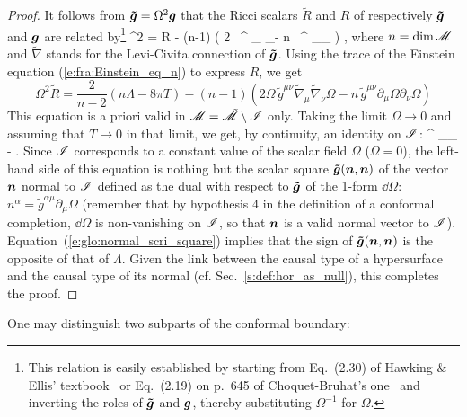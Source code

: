\begin{proof}
It follows from $\bm{\tilde{g}} = \Omega^2 \bm{g}$ that the Ricci scalars $\tilde{R}$
and $R$ of respectively $\bm{\tilde{g}}$ and $\bm{g}$ are related by\footnote{This relation is
easily established by starting from Eq.~(2.30) of Hawking \& Ellis' textbook~\cite{HawkiE73} or Eq.~(2.19) on p.~645 of Choquet-Bruhat's one~\cite{Choqu09} and inverting the roles of $\bm{\tilde{g}}$ and $\bm{g}$, thereby substituting
$\Omega^{-1}$ for $\Omega$.}
\be \label{e:glo:tildeR_R}
    \Omega^2  = R - (n-1) \left( 2 \Omega \, ^{\mu\nu} \tilde{\nabla}_\mu
    \tilde{\nabla}_\nu \Omega - n \, ^{\mu\nu} \partial_\mu \Omega \partial_\nu \Omega
    \right) ,
\ee
where $n = \mathrm{dim}\, \mathscr{M}$ and $\tilde{\nabla}$ stands for the Levi-Civita connection of
$\bm{\tilde{g}}$. Using the trace of the Einstein equation (\ref{e:fra:Einstein_eq_n}) to
express $R$, we get
\[
    \Omega^2 \tilde{R} = \frac{2}{n-2}\left( n \Lambda - 8\pi T \right)
     - (n-1) \left( 2 \Omega \, \tilde{g}^{\mu\nu} \tilde{\nabla}_\mu
    \tilde{\nabla}_\nu \Omega - n \, \tilde{g}^{\mu\nu} \partial_\mu \Omega \partial_\nu \Omega
    \right)
\]
This equation is a priori valid in $\mathscr{M} = \tilde{\mathscr{M}}\setminus\mathscr{I}$ only.
Taking the limit $\Omega\rightarrow 0$ and
assuming that $T\rightarrow 0$ in that limit, we get, by continuity, an identity
on $\mathscr{I}$:
\be \label{e:glo:normal_scri_square}
^{\mu\nu} \partial_\mu \Omega \partial_\nu \Omega \stackrel{\scri}{=}
    -  \Lambda .
\ee
Since $\mathscr{I}$ corresponds to a constant value of the scalar field $\Omega$ ($\Omega=0$),
the left-hand side of this equation is nothing but the scalar square
$\bm{\tilde{g}}(\bm{n},\bm{n})$ of the vector $\bm{n}$ normal to $\mathscr{I}$
defined as the dual with respect to $\bm{\tilde{g}}$ of the 1-form
$\dd\Omega$: $n^\alpha = \tilde{g}^{\alpha\mu} \partial_\mu \Omega$
(remember that by hypothesis 4 in the definition
of a conformal completion, $\dd\Omega$ is non-vanishing on $\mathscr{I}$, so that
$\bm{n}$  is a valid normal
vector to $\mathscr{I}$). Equation~(\ref{e:glo:normal_scri_square}) implies
that the sign of $\bm{\tilde{g}}(\bm{n},\bm{n})$ is the opposite of that of $\Lambda$.
Given the link between the causal type of a hypersurface and the causal type of its normal
(cf. Sec.~\ref{s:def:hor_as_null}), this completes the proof.
\end{proof}

One may distinguish two subparts of the conformal boundary:

